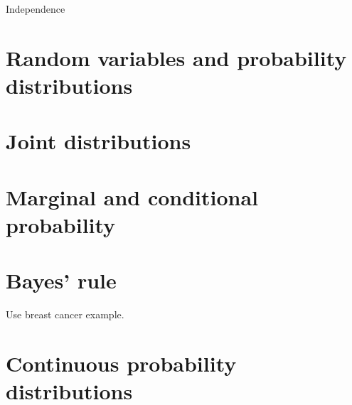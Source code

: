 \documentclass{beamer}
\begin{document}
	\begin{frame}
		Independence
	\end{frame}
	

	\section{Random variables and probability distributions}


	\section{Joint distributions}
	\frame{\tableofcontents[currentsection]}

	\section{Marginal and conditional probability}
	\frame{\tableofcontents[currentsection]}
	
	\section{Bayes' rule}
	\frame{\tableofcontents[currentsection]}
	
	Use breast cancer example.
	
	\section{Continuous probability distributions}
	\frame{\tableofcontents[currentsection]}
	
\end{document}
